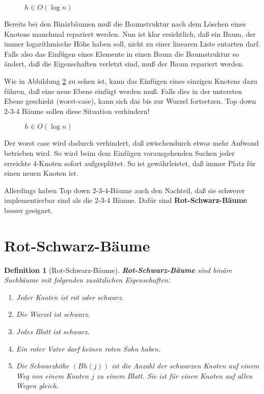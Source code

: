 \documentclass[ngerman,draft,parskip=half*,twoside]{scrreprt}
\theoremstyle{break}
\newtheorem{definition}{Definition}
\begin{document}
\begin{figure}[H]
    \centering
    \caption{$h \in O(\log n)$}
    \label{241103a}
 \end{figure}	

Bereits bei den Binärbäumen muß die Baumstruktur nach dem Löschen eines Knotens manchmal repariert werden.
Nun ist klar ersichtlich, daß ein Baum, der immer logarithmische Höhe haben soll, nicht zu einer linearen Liste entarten darf. 	
Falls also das Einfügen eines Elemente in einen Baum die Baumstruktur so ändert, daß die Eigenschaften 
verletzt sind, muß der Baum repariert werden.

Wie in Abbildung \ref{241103b} zu sehen ist, kann das Einfügen eines einzigen Knotens dazu führen, daß eine neue Ebene
einfügt werden muß. Falls dies in der untersten Ebene geschieht (worst-case), kann sich das bis zur Wurzel fortsetzen.	
Top down 2-3-4 Bäume sollen diese Situation verhindern! 
 
 \begin{figure}[H]
    \centering
    \caption{$h \in O(\log n)$}
    \label{241103b}
 \end{figure}

Der worst case wird dadurch verhindert, daß zwischendurch etwas mehr Aufwand betrieben wird.
So wird beim dem Einfügen vorausgehenden Suchen jeder erreichte 4-Knoten sofort aufgesplittet.
So ist gewährleistet, daß immer Platz für einen neuen Knoten ist.

Allerdings haben Top down 2-3-4-Bäume auch den Nachteil, daß sie schwerer implementierbar sind als die 2-3-4 Bäume. 
    Dafür sind \textbf{Rot-Schwarz-Bäume} besser geeignet. %

\section{Rot-Schwarz-Bäume}
 
\begin{definition}[Rot-Schwarz-Bäume]
   \textbf{Rot-Schwarz-Bäume} sind binäre Suchbäume mit folgenden zusätzlichen Eigenschaften:
      \begin{enumerate}
	          \item Jeder Knoten ist rot oder schwarz.
	          \item Die Wurzel ist schwarz.
	          \item Jedes Blatt ist schwarz.
	          \item Ein roter Vater darf keinen roten Sohn haben.
	          \item Die Schwarzhöhe $(Bh(j))$ ist die Anzahl der schwarzen Knoten auf einem Weg von einem Knoten $j$ zu einem
		  Blatt. Sie ist für einen Knoten auf allen Wegen gleich.
      \end{enumerate}
\end{definition}
\end{document}
